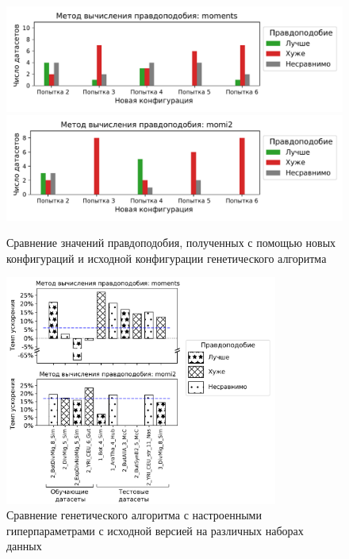 \begin{figure}[ht]
    \centering
    \includegraphics[width=.8\textwidth]{images/part2/genetics_algorithm/conf_comp_moments_rus.pdf}
    \includegraphics[width=.8\textwidth]{images/part2/genetics_algorithm/conf_comp_momi2_rus.pdf}
    \caption{Сравнение значений правдоподобия, полученных с помощью новых конфигураций и исходной конфигурации генетического алгоритма}
    \label{fig:part2:genetic_algorithm:HPO:ll_comp}
\end{figure}

\begin{figure}[ht]
    \centering
    \includegraphics[width=0.8\textwidth]{images/part2/genetics_algorithm/GADMA2_comp_rus.pdf}
    \caption{Сравнение генетического алгоритма с настроенными гиперпараметрами с исходной версией на различных наборах данных}
    \label{fig:part2:genetic_algorithm:HPO:final_comp}
\end{figure}



